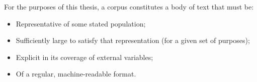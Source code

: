 For the purposes of this thesis, a corpus constitutes a body of text that must be:

\begin{itemize}
    \item Representative of some stated population;
    \item Sufficiently large to satisfy that representation (for a given set of purposes);
    \item Explicit in its coverage of external variables;
    \item Of a regular, machine-readable format.
\end{itemize}


% 
% 
% 
% 
% 












